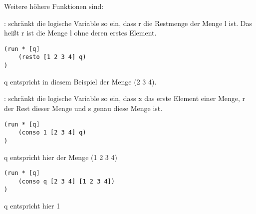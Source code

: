 Weitere höhere Funktionen sind:
\begin{description}
\item{:}
 schränkt die logische Variable so ein, dass r die Restmenge der Menge l ist. Das heißt r ist die Menge l ohne deren erstes Element.
\begin{lstlisting}
(run * [q]
	(resto [1 2 3 4] q)
)
\end{lstlisting}
q entspricht in diesem Beispiel der Menge (2 3 4).
\item{:}
 schränkt die logische Variable so ein, dass x das erste Element einer Menge, r der Rest dieser Menge und s genau diese Menge ist.

\begin{lstlisting}
(run * [q]
	(conso 1 [2 3 4] q)
)
\end{lstlisting}
q entspricht hier der Menge (1 2 3 4)

\begin{lstlisting}
(run * [q]
	(conso q [2 3 4] [1 2 3 4])
)
\end{lstlisting}
q entspricht hier 1
\end{description}
